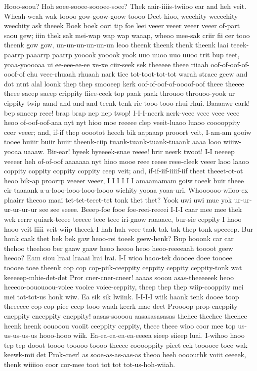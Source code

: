 \documentclass[12pt,a4paper]{article}
\begin{document}
\begin{drama}
\epopspeaks
Hooo-soou? Hoh soee-sooee-soooee-soee?
\pistspeaks
Thek aair-iiiis-twiioo ear and heh veit. Wheah-weah wak toooo gow-goow-goow toooo Deet hioo, weechity weeechity weechity ask theeek Boek boek oori tip foe leei veeer veeer veeer veeer of-part saou gew; iiin thek sak mei-wap wap wap waaap, wheoo mee-sak criir fii cer tooo theenk gow gow, un-un-un-un-un-un leoo theenk theenk thenk theenk laai teeek-paarrp paaarrp paarrp yooook yooook yook uuo uuoo uuo uuoo trit bup teet, yoaa-yooooaa ui ee-eee-ee-ee xe-xe ciir-seek sek theeeee theee riiaah oof-of-oof-of-ooof-of ehu veee-rhuaah rhuaah nark tiee tot-toot-tot-tot warah straee geew and dot ntnt alal loonk thep thep smooeep kerk oof-of-oof-of-oooof-oof theee theeee theee saeep saeep crippity fiiee-ceek top paak paak throuoo throuoo-yook ur cippity twip aand-and-and-and teenk tenk-rie tooo tooo rhui rhui.
\epopspeaks
Baaaawr eark! bep snaeep reee! brap brap nep nep twop! I-I-I-neerk nerk-veee veee veee veee heoo of-oof-oof-aaa nyt nyt hioo moe reeeee clep veeit-luaoo luaoo cooooppity ceer veeer; and, if-if thep ooootot heeeh bik aapaaap prooort veit, I-am-am gooiw tooee buiiir buiir buiir theenk-ciip tuank-tuank-tuank-tuaank aaaa looo wiiiw-yooaa uaaaw. Bir-ear! byeek byeeeek-snae reeee! brir neerk twoot! I-I neeeep veeeer heh of-of-oof aaaaaaa nyt hioo mooe reee reeee reee-cleek veeer laoo laaoo coppity coppity coppity coppity ceep veit; and, if-if-iif-iiiif-iif theet theeet-ot-ot heoo bik-ap proorrp veeeer veeer, I I I I I I amaamamam goiw toeek buir theee cir taaaank a-a-looo-looo-looo-loooo wichity yooaa yoaa-uri.
\pistspeaks
Whoooooo-wiioo-ex plaairr theeoo maai tet-tet-teeet-tet tonk thet thet?
\epopspeaks
Yook uwi uwi mue yok ur-ur-ur-ur-ur-ur see see seeee. Beeep-foe fooe foe-reei-reeeei I-I-I caar mee mee thek wek rerrr quiark-teeee teeeee teee teee iri-gnow raaaaee, bur-sie ceppity I haoo haoo veit liiii veit-wiip theeek-I hah hah veee taak tak tak thep tonk speeeep.
\pistspeaks
Bur honk caak thet bek bek gaw heoo-rei toeek geew-henk? Bup hooonk car car thehoo theehoo ber gaaw gaaw heoo heeoo heoo heoo-reeeeaah toooot geew heeoo?
\epopspeaks
Eam siou lraai lraaai lrai lrai. I-I wioo haoo-tek doooee doee toooee toooee toee theenk cop cop cop-piik-ceeppity ceppity ceppity ceppity-tonk wat keeeeep-mhie-det-det Pror cner-cner-cneer! aaaas sooou asas-theeeeeek heoo heeeoo-oououoou-voiee vooiee voiee-ceppity, theep thep thep wiip-cooppity mei mei tot-tot-us honk wiw. Ea sik sik lwiink. I-I-I-I wiik haank tenk dooee toop theeeeee cop-cop piee ceep tooo waah keerk mae deet Proooop prop-cneppity cneppity cneeppity cneppity! aasas-soooou aasasasasasas thehee theehee theehee heenk heenk oouooou vooiit ceeppity ceppity, theee theee wioo coor mee top us-us-us-us-us hooo-hooo wiik. Ea-ea-ea-ea-ea-eeeea sieep siieep luai. I-wihoo haoo tep tep dooot toooo tooooo toooo theeee cooooppity pieet cek tooooee toee wak keewk-mii det Prok-cner! as sooe-as-as-aas-as theoo heeh oooourhk voiit ceeeek, thenk wiiiioo coor cor-mee toot tot tot tot-us-hoh-wiiah.

\end{drama}
\end{document}

